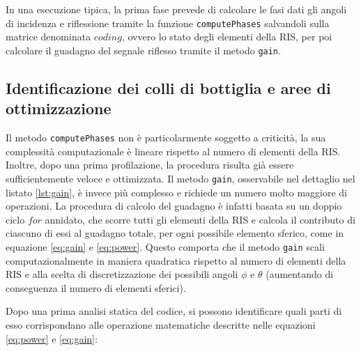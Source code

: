 In una esecuzione tipica, la prima fase prevede di calcolare le fasi dati gli
angoli di incidenza e riflessione tramite la funzione \texttt{computePhases} salvandoli
sulla matrice denominata $coding$, ovvero lo stato degli elementi della RIS, per
poi calcolare il guadagno del segnale riflesso tramite il metodo \texttt{gain}.

\subsection{Identificazione dei colli di bottiglia e aree di ottimizzazione}
\label{sec:ottimizzazione}

Il metodo \texttt{computePhases} non è particolarmente soggetto a criticità, la sua
complessità computazionale è lineare rispetto al numero di elementi della RIS.
Inoltre, dopo una prima profilazione, la procedura risulta già essere
sufficientemente veloce e ottimizzata. Il metodo \texttt{gain}, osservabile nel dettaglio
nel listato \ref{lst:gain}, è invece più complesso e richiede un numero molto
maggiore di operazioni. La procedura di calcolo del guadagno è infatti basata su
un doppio ciclo $for$ annidato, che scorre tutti gli elementi della RIS e
calcola il contributo di ciascuno di essi al guadagno totale, per ogni possibile
elemento sferico, come in equazione \ref{eq:gain} e \ref{eq:power}. Questo comporta
che il metodo \texttt{gain} scali computazionalmente in maniera quadratica
rispetto al numero di elementi della RIS e alla scelta di discretizzazione dei
possibili angoli $\phi$ e $\theta$ (aumentando di conseguenza il numero di elementi
sferici).

\vspace{1em}

\vspace{1em}

Dopo una prima analisi statica del codice, si possono identificare quali parti
di esso corrispondano alle operazione matematiche descritte nelle equazioni
\ref{eq:power} e \ref{eq:gain}:

